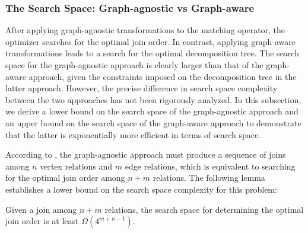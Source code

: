 \subsubsection{The Search Space: Graph-agnostic vs Graph-aware}
\label{sec:compare-search-space}
After applying graph-agnostic transformations to the matching operator, the optimizer searches for the optimal join order. In contrast, applying graph-aware transformations leads to a search for the optimal decomposition tree. The search space for the graph-agnostic approach is clearly larger than that of the graph-aware approach, given the constraints imposed on the decomposition tree in the latter approach. However, the precise difference in search space complexity between the two approaches has not been rigorously analyzed. In this subsection, we derive a lower bound on the search space of the graph-agnostic approach and an upper bound on the search space of the graph-aware approach to demonstrate that the latter is exponentially more efficient in terms of search space.

According to , the graph-agnostic approach must produce a sequence of joins among $n$ vertex relations and $m$ edge relations,
which is equivalent to searching for the optimal join order among $n + m$ relations. The following lemma
establishes a lower bound on the search space complexity for this problem:

\begin{lemma}
\label{lem:complexity-of-volcano}
Given a join among $n + m$ relations, the search space for determining the optimal join order is at least $\Omega(4^{m+n-1})$.
\end{lemma}

